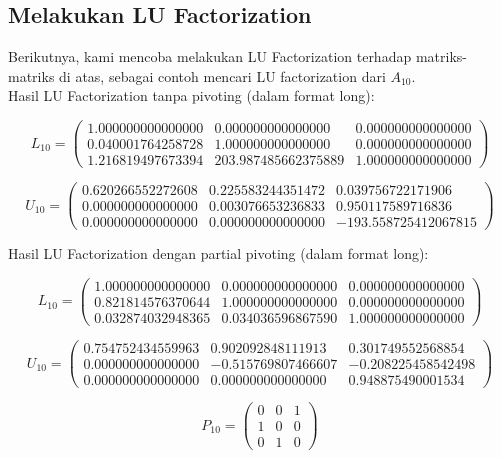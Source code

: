 \documentclass[11pt]{article}
\begin{document}
\vspace{3mm}


\subsection{Melakukan LU Factorization}
Berikutnya, kami mencoba melakukan LU Factorization terhadap matriks-matriks di atas, sebagai contoh mencari LU factorization dari $A_{10}.$ \\

Hasil LU Factorization tanpa pivoting (dalam format long):

\[
L_{10} = \begin{pmatrix}
1.000000000000000 & 0.000000000000000 & 0.000000000000000\\
0.040001764258728 & 1.000000000000000 & 0.000000000000000\\
1.216819497673394 & 203.987485662375889 & 1.000000000000000
\end{pmatrix}
\]

\[
U_{10} = \begin{pmatrix}
0.620266552272608 & 0.225583244351472 &  0.039756722171906\\
0.000000000000000 & 0.003076653236833 & 0.950117589716836\\
0.000000000000000 & 0.000000000000000 & -193.558725412067815
\end{pmatrix}
\]

\vspace{3mm}

Hasil LU Factorization dengan partial pivoting (dalam format long):

\[
L_{10} = \begin{pmatrix}
1.000000000000000 & 0.000000000000000 & 0.000000000000000\\
0.821814576370644 & 1.000000000000000 & 0.000000000000000\\
0.032874032948365 & 0.034036596867590 & 1.000000000000000
\end{pmatrix}
\]

\[
U_{10} = \begin{pmatrix}
0.754752434559963 &  0.902092848111913 &  0.301749552568854\\
0.000000000000000 & -0.515769807466607 & -0.208225458542498\\
0.000000000000000 & 0.000000000000000 &  0.948875490001534
\end{pmatrix}
\]

\[
P_{10} = \begin{pmatrix}
0 & 0 & 1\\
1 & 0 & 0\\
0 & 1 & 0
\end{pmatrix}
\]
\end{document}
